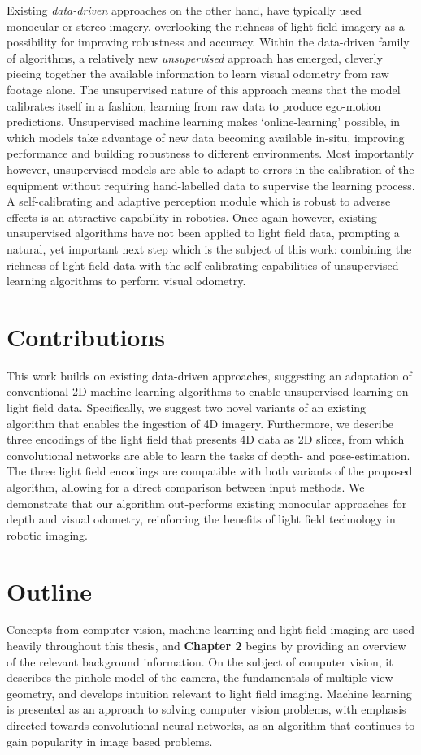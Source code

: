 Existing \textit{data-driven} approaches on the other hand, have typically used monocular or stereo imagery, overlooking the richness of light field imagery as a possibility for improving robustness and accuracy. Within the data-driven family of algorithms, a relatively new \textit{unsupervised} approach has emerged, cleverly piecing together the available information to learn visual odometry from raw footage alone. The unsupervised nature of this approach means that the model calibrates itself in a fashion, learning from raw data to produce ego-motion predictions. Unsupervised machine learning makes `online-learning' possible, in which models take advantage of new data becoming available in-situ, improving performance and building robustness to different environments. Most importantly however, unsupervised models are able to adapt to errors in the calibration of the equipment without requiring hand-labelled data to supervise the learning process. A self-calibrating and adaptive perception module which is robust to adverse effects is an attractive capability in robotics. Once again however, existing unsupervised algorithms have not been applied to light field data, prompting a natural, yet important next step which is the subject of this work: combining the richness of light field data with the self-calibrating capabilities of unsupervised learning algorithms to perform visual odometry.



\section{Contributions}
This work builds on existing data-driven approaches, suggesting an adaptation of conventional 2D machine learning algorithms to enable unsupervised learning on light field data. Specifically, we suggest two novel variants of an existing algorithm that enables the ingestion of 4D imagery. Furthermore, we describe three encodings of the light field that presents 4D data as 2D slices, from which convolutional networks are able to learn the tasks of depth- and pose-estimation. The three light field encodings are compatible with both variants of the proposed algorithm, allowing for a direct comparison between input methods. We demonstrate that our algorithm out-performs existing monocular approaches for depth and visual odometry, reinforcing the benefits of light field technology in robotic imaging.

\section{Outline}
Concepts from computer vision, machine learning and light field imaging are used heavily throughout this thesis, and \textbf{Chapter 2} begins by providing an overview of the relevant background information. On the subject of computer vision, it describes the pinhole model of the camera, the fundamentals of multiple view geometry, and develops intuition relevant to light field imaging. Machine learning is presented as an approach to solving computer vision problems, with emphasis directed towards convolutional neural networks, as an algorithm that continues to gain popularity in image based problems.

